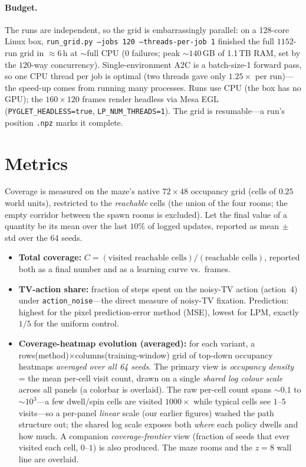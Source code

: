 \documentclass[11pt]{article}
\newcommand{\cov}{C}
\begin{document}
\paragraph{Budget.} The runs are independent, so the grid is embarrassingly parallel: on a 128-core
Linux box, \texttt{run\_grid.py --jobs 120 --threads-per-job 1} finished the full $1152$-run grid in
$\approx\!6$\,h at $\sim\!$full CPU ($0$ failures; peak $\sim\!140$\,GB of 1.1\,TB RAM, set by the
$120$-way concurrency). Single-environment A2C is a batch-size-1 forward pass, so one CPU thread per
job is optimal (two threads gave only $1.25\times$ per run)---the speed-up comes from running many
processes. Runs use CPU (the box has no GPU); the $160\times120$ frames render headless via Mesa EGL
(\texttt{PYGLET\_HEADLESS=true}, \texttt{LP\_NUM\_THREADS=1}). The grid is resumable---a run's
position \texttt{.npz} marks it complete.

\section{Metrics}
Coverage is measured on the maze's native $72\times48$ occupancy grid (cells of $0.25$ world units),
restricted to the \emph{reachable} cells (the union of the four rooms; the empty corridor between the
spawn rooms is excluded). Let the final value of a quantity be its mean over the last $10\%$ of
logged updates, reported as mean$\,\pm\,$std over the 64 seeds.

\begin{itemize}[leftmargin=1.4em]
  \item \textbf{Total coverage:} $\cov = (\text{visited reachable cells})/(\text{reachable cells})$,
  reported both as a final number and as a learning curve vs.\ frames.
  \item \textbf{TV-action share:} fraction of steps spent on the noisy-TV action (action~4) under
  \texttt{action\_noise}---the direct measure of noisy-TV fixation. Prediction: highest for the pixel
  prediction-error method (MSE), lowest for LPM, exactly $1/5$ for the uniform control.
  \item \textbf{Coverage-heatmap evolution (averaged):} for each variant, a
  rows(method)$\times$columns(training-window) grid of top-down occupancy heatmaps \emph{averaged
  over all 64 seeds}. The primary view is \emph{occupancy density} = the mean per-cell visit count,
  drawn on a single \emph{shared log colour scale} across all panels (a colorbar is overlaid). The
  raw per-cell count spans $\sim\!0.1$ to $\sim\!10^{3}$---a few dwell/spin cells are visited
  $1000\times$ while typical cells see $1$--$5$ visits---so a per-panel \emph{linear} scale (our
  earlier figures) washed the path structure out; the shared log scale exposes both \emph{where} each
  policy dwells and how much. A companion \emph{coverage-frontier} view (fraction of seeds that ever
  visited each cell, $0$--$1$) is also produced. The maze rooms and the $z=8$ wall line are overlaid.
\end{itemize}
\end{document}
